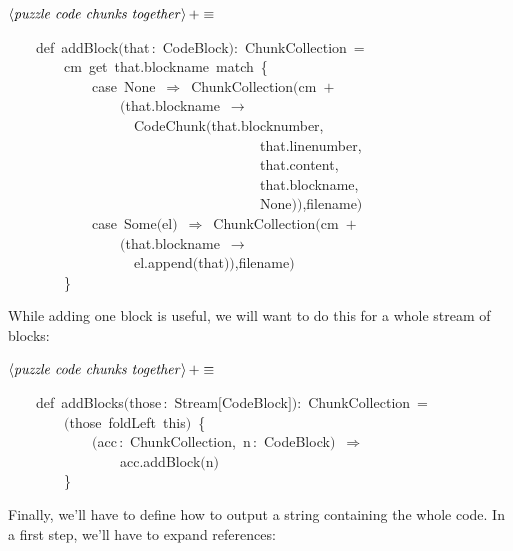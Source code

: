 \documentclass[a4paper,12pt]{article}
\begin{document}
$\left<\mbox{\emph{puzzle code chunks together}}\right>+\equiv$
\begin{program}~~~~{\vem def}~addBlock$($that\,{\rm :}~CodeBlock$)${\rm :}~ChunkCollection~=
\\~~~~~~~~cm~get~that.blockname~{\vem match}~{\small\{}
\\~~~~~~~~~~~~{\vem case}~None~$\Rightarrow$~ChunkCollection$($cm~$+$
\\~~~~~~~~~~~~~~~~$($that.blockname~$\rightarrow$
\\~~~~~~~~~~~~~~~~~~CodeChunk$($that.blocknumber,
\\~~~~~~~~~~~~~~~~~~~~~~~~~~~~~~~~~~~~that.linenumber,
\\~~~~~~~~~~~~~~~~~~~~~~~~~~~~~~~~~~~~that.content,
\\~~~~~~~~~~~~~~~~~~~~~~~~~~~~~~~~~~~~that.blockname,
\\~~~~~~~~~~~~~~~~~~~~~~~~~~~~~~~~~~~~None$)$$)$,filename$)$
\\~~~~~~~~~~~~{\vem case}~Some$($el$)$~$\Rightarrow$~ChunkCollection$($cm~$+$
\\~~~~~~~~~~~~~~~~$($that.blockname~$\rightarrow$
\\~~~~~~~~~~~~~~~~~~el.append$($that$)$$)$,filename$)$
\\~~~~~~~~{\small\}}
\\[0.5em]\end{program}



While adding one block is useful, we will want to do this
for a whole stream of blocks:

$\left<\mbox{\emph{puzzle code chunks together}}\right>+\equiv$
\begin{program}~~~~{\vem def}~addBlocks$($those\,{\rm :}~Stream$[$CodeBlock$]$$)${\rm :}~ChunkCollection~=
\\~~~~~~~~$($those~foldLeft~{\vem this}$)$~{\small\{}
\\~~~~~~~~~~~~$($acc\,{\rm :}~ChunkCollection,~n\,{\rm :}~CodeBlock$)$~$\Rightarrow$
\\~~~~~~~~~~~~~~~~acc.addBlock$($n$)$
\\~~~~~~~~{\small\}}
\\[0.5em]\end{program}



Finally, we'll have to define how to output a string containing the
whole code. In a first step, we'll have to expand references:
\end{document}
